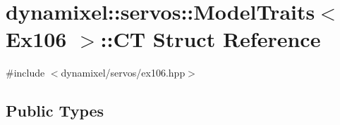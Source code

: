\hypertarget{structdynamixel_1_1servos_1_1_model_traits_3_01_ex106_01_4_1_1_c_t}{}\section{dynamixel\+:\+:servos\+:\+:Model\+Traits$<$ Ex106 $>$\+:\+:C\+T Struct Reference}
\label{structdynamixel_1_1servos_1_1_model_traits_3_01_ex106_01_4_1_1_c_t}


{\ttfamily \#include $<$dynamixel/servos/ex106.\+hpp$>$}

\subsection*{Public Types}
